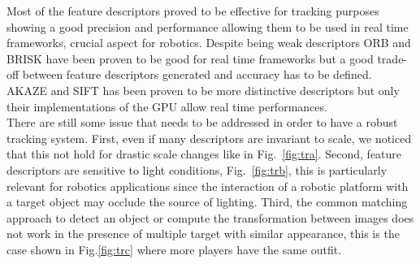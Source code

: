 Most of the feature descriptors proved to be effective for tracking purposes showing a good precision and performance allowing them to be used in real time frameworks, crucial aspect for robotics. Despite being weak descriptors ORB and BRISK have been proven to be good for real time frameworks but a good trade-off between feature descriptors generated and accuracy has to be defined. AKAZE and SIFT has been proven to be more distinctive descriptors but only their implementations of the GPU allow real time performances. \\
There are still some issue that needs to be addressed in order to have a robust tracking system. First, even if many descriptors are invariant to scale, we noticed that this not hold for drastic scale changes like in Fig.~\ref{fig:tra}. Second, feature descriptors are sensitive to light conditions, Fig.~\ref{fig:trb}, this is particularly relevant for robotics applications since the interaction of a robotic platform with a target object may occlude the source of lighting. Third, the common matching approach to detect an object or compute the transformation between images \cite{mikolajczyk05} does not work in the presence of multiple target with similar appearance, this is the case shown in Fig.\ref{fig:trc} where more players have the same outfit.









